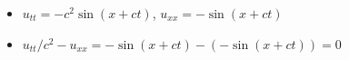 \begin{itemize}
	\item $u_{tt} = -c^2\sin(x+ct)$, $u_{xx} = -\sin(x+ct)$
	\item $u_{tt}/c^2 - u_{xx} = -\sin(x+ct) - (-\sin(x+ct)) = 0$
\end{itemize}
